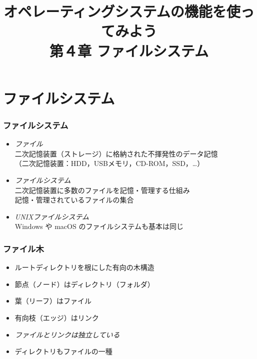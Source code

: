 \documentclass{beamer}                 %
\begin{document}
\title{オペレーティングシステムの機能を使ってみよう\\
第４章 ファイルシステム}
\date{}

\begin{frame}
  \titlepage
\end{frame}


\section{ファイルシステム}
\begin{frame}[fragile]
  \frametitle{ファイルシステム}
  \begin{itemize}
    \item \emph{ファイル}\\
      二次記憶装置（ストレージ）に格納された不揮発性のデータ記憶\\
      （二次記憶装置：HDD，USBメモリ，CD-ROM，SSD，…）
    \item \emph{ファイルシステム}\\
      二次記憶装置に多数のファイルを記憶・管理する仕組み\\
      記憶・管理されているファイルの集合
    \item \emph{UNIXファイルシステム}\\
      Windows や macOS のファイルシステムも基本は同じ
  \end{itemize}
\end{frame}

\begin{frame}[fragile]
  \frametitle{ファイル木}

  \begin{itemize}
  \item ルートディレクトリを根にした有向の木構造
  \item 節点（ノード）はディレクトリ（フォルダ）
  \item 葉（リーフ）はファイル
  \item 有向枝（エッジ）はリンク
  \item \emph{ファイルとリンクは独立している}
  \item ディレクトリもファイルの一種
  \end{itemize}
\end{frame}
\end{document}

